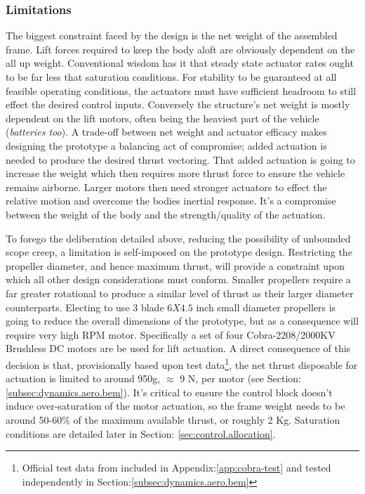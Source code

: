 \subsubsection{Limitations}
\label{subsubsec:intro.foreword.limits}
The biggest constraint faced by the design is the net weight of the assembled frame. Lift forces required to keep the body aloft are obviously dependent on the all up weight. Conventional wisdom has it that steady state actuator rates ought to be far less that saturation conditions. For stability to be guaranteed at all feasible operating conditions, the actuators must have sufficient headroom to still effect the desired control inputs. Conversely the structure's net weight is mostly dependent on the lift motors, often being the heaviest part of the vehicle (\emph{batteries too}). A trade-off between net weight and actuator efficacy makes designing the prototype a balancing act of compromise; added actuation is needed to produce the desired thrust vectoring. That added actuation is going to increase the weight which then requires more thrust force to ensure the vehicle remains airborne. Larger motors then need stronger actuators to effect the relative motion and overcome the bodies inertial response. It's a compromise between the weight of the body and the strength/quality of the actuation.
\par
To forego the deliberation detailed above, reducing the possibility of unbounded scope creep, a limitation is self-imposed on the prototype design. Restricting the propeller diameter, and hence maximum thrust, will provide a constraint upon which all other design considerations must conform. Smaller propellers require a far greater rotational to produce a similar level of thrust as their larger diameter counterparts. Electing to use 3 blade $6X4.5$ inch small diameter propellers is going to reduce the overall dimensions of the prototype, but as a consequence will require very high RPM motor. Specifically a set of four Cobra-2208/2000KV\cite{cobramotor} Brushless DC motors are be used for lift actuation. A direct consequence of this decision is that, provisionally based upon test data\footnote{Official test data from\cite{cobramotor} included in Appendix:\ref{app:cobra-test} and tested independently in Section:\ref{subsec:dynamics.aero.bem}}, the net thrust disposable for actuation is limited to around 950g, $\approx$ 9 N, per motor (see Section:\ref{subsec:dynamics.aero.bem}). It's critical to ensure the control block doesn't induce over-saturation of the motor actuation, so the frame weight needs to be around 50-60\% of the maximum available thrust, or roughly 2 Kg. Saturation conditions are detailed later in Section: \ref{sec:control.allocation}.
